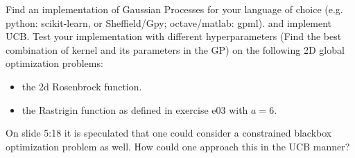 

\renewcommand{\course}{Optimization}
\renewcommand{\coursepicture}{optim}
\renewcommand{\coursedate}{Summer 2015}
\renewcommand{\exnum}{8}

\exercises



Find an implementation of Gaussian Processes for your language of choice (e.g.
python: scikit-learn, or Sheffield/Gpy; octave/matlab: gpml).  and implement
UCB.  Test your implementation with different hyperparameters (Find the best
combination of kernel and its parameters in the GP) on the following 2D global
optimization problems:
\begin{itemize}
  \item the 2d Rosenbrock function.
  \item the Rastrigin function as defined in exercise e03 with $a=6$.
\end{itemize}



On slide 5:18 it is speculated that one could consider a constrained
blackbox optimization problem as well. How could one approach this in
the UCB manner?


\exerfoot
